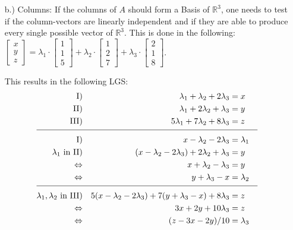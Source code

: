 \documentclass[%
   10pt,              %
   a4paper,           %
   DIV10,             %
]{scrartcl}%
\begin{document}
\begin{itemize}
	\item[b.)] Columns: If the columns of $A$ should form a Basis of $\mathbb{R}^3$, one needs to test if the column-vectors are linearly independent and if they are able to produce every single possible vector of $\mathbb{R}^3$. This is done in the following:\newline
	\noindent $\begin{bmatrix}
	x\\
	y\\
	z
	\end{bmatrix} = \lambda_1 \cdot \begin{bmatrix}
	1\\
	1\\
	5
	\end{bmatrix} + \lambda_2 \cdot \begin{bmatrix}
	1\\
	2\\
	7
	\end{bmatrix} + \lambda_3 \cdot \begin{bmatrix}
	2\\
	1\\
	8
	\end{bmatrix}$.\newline\noindent 
	
	This results in the following LGS:\newline\noindent
	\begin{align*}
	\text{I)} && \lambda_1 + \lambda_2 + 2\lambda_3 &= x &&\\
	\text{II)} && \lambda_1 + 2\lambda_2 + \lambda_3&= y &&\\
	\text{III)} && 5\lambda_1 + 7\lambda_2 + 8\lambda_3&= z &&\\[-1.7ex]
	\cline{1-6}
	\text{I)} && x - \lambda_2 - 2\lambda_3 &=\lambda_1 &&\\
	\text{$\lambda_1$ in II)} && (x - \lambda_2 - 2\lambda_3) + 2\lambda_2 + \lambda_3 &= y\\
	\text{$\Leftrightarrow$} && x+ \lambda_2 - \lambda_3 &= y\\
	\text{$\Leftrightarrow$} && y + \lambda_3 - x &= \lambda_2&&\\[-1.7ex]
	\cline{1-6}
	\text{$\lambda_1, \lambda_2$ in III)} &&  5(x- \lambda_2 -2\lambda_3) + 7(y + \lambda_3 - x) + 8 \lambda_3 &= z\\
	\text{$\Leftrightarrow$} && 3x + 2y + 10\lambda_3 &=z\\
	\text{$\Leftrightarrow$} && (z-3x -2y)/10&= \lambda_3\\
	\end{align*}
	

\end{itemize}
\end{document}

